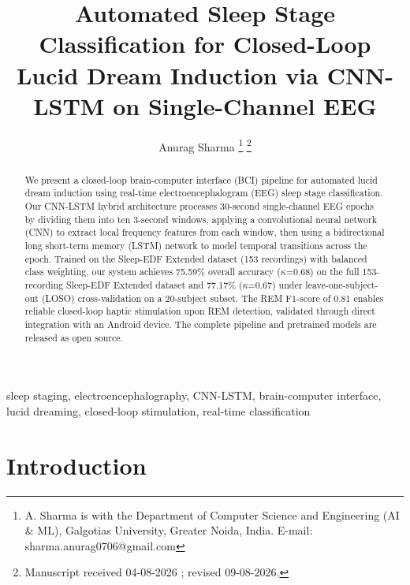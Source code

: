 \documentclass[journal]{IEEEtran}
\begin{document}
\title{Automated Sleep Stage Classification for 
Closed-Loop Lucid Dream Induction via CNN-LSTM 
on Single-Channel EEG}

\author{Anurag Sharma
\thanks{A. Sharma is with the Department of Computer
Science and Engineering (AI \& ML), Galgotias University,
Greater Noida, India.
E-mail: sharma.anurag0706@gmail.com}
\thanks{Manuscript received 04-08-2026 ; revised 09-08-2026.}}


\maketitle

\begin{abstract}
We present a closed-loop brain-computer interface (BCI)
pipeline for automated lucid dream induction using
real-time electroencephalogram (EEG) sleep stage
classification.
Our CNN-LSTM hybrid architecture processes 30-second
single-channel EEG epochs by dividing them into ten
3-second windows, applying a convolutional neural
network (CNN) to extract local frequency features
from each window, then using a bidirectional long
short-term memory (LSTM) network to model temporal
transitions across the epoch.
Trained on the Sleep-EDF Extended dataset
(153 recordings) with balanced class weighting,
our system achieves 75.59\% overall accuracy ($\kappa$=0.68) 
on the full 153-recording Sleep-EDF Extended dataset 
and 77.17\% ($\kappa$=0.67) under leave-one-subject-out 
(LOSO) cross-validation on a 20-subject subset.
The REM F1-score of 0.81 enables reliable closed-loop
haptic stimulation upon REM detection, validated
through direct integration with an Android device.
The complete pipeline and pretrained models are
released as open source.
\end{abstract}

\begin{IEEEkeywords}
sleep staging, electroencephalography, CNN-LSTM,
brain-computer interface, lucid dreaming,
closed-loop stimulation, real-time classification
\end{IEEEkeywords}

\section{Introduction}
\label{sec:intro}
\end{document}
